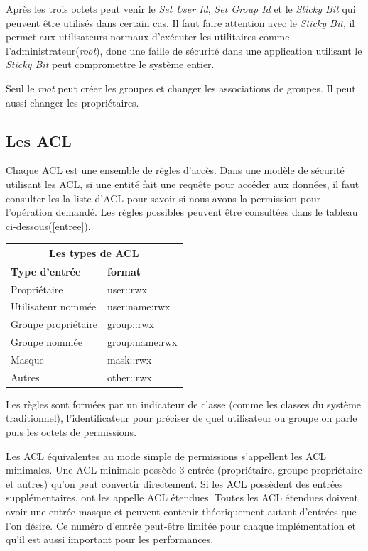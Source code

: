 Après les trois octets peut venir le \emph{Set User Id}, \emph{Set Group Id} et le \emph{Sticky Bit} qui peuvent être utilisés dans certain cas. Il faut faire attention avec le \emph{Sticky Bit}, il permet aux utilisateurs normaux d'exécuter les utilitaires comme l'administrateur(\emph{root}), donc une faille de sécurité dans une application utilisant le \emph{Sticky Bit} peut compromettre le système entier.
 
Seul le \emph{root} peut créer les groupes et changer les associations de groupes. Il peut aussi changer les propriétaires.
 
\subsection*{Les ACL}
 
Chaque ACL est une ensemble de règles d'accès. Dans une modèle de sécurité utilisant les ACL, si une entité fait une requête pour accéder aux données, il faut consulter les la liste d'ACL pour savoir si nous avons la permission pour l'opération demandé. Les règles possibles peuvent être consultées dans le tableau ci-dessous(\ref{entree}).

\begin{center}
\begin{tabular}{|l|l|}
  \hline
    \multicolumn{2}{|c|}{Les types de ACL} \\
  \hline
\textbf{Type d'entrée} & \textbf{format} \\
  \hline
Propriétaire & user::rwx \\
Utilisateur nommée & user:name:rwx \\
Groupe propriétaire & group::rwx \\
Groupe nommée & group:name:rwx \\
Masque & mask::rwx \\
Autres & other::rwx \\
  \hline
\end{tabular}
\label{tab:entree}
\end{center}
 
Les règles sont formées par un indicateur de classe (comme les classes du système traditionnel), l'identificateur pour préciser de quel utilisateur ou groupe on parle puis les octets de permissions.

Les ACL équivalentes au mode simple de permissions s'appellent les ACL minimales. Une ACL minimale possède 3 entrée (propriétaire, groupe propriétaire et autres) qu'on peut convertir directement. Si les ACL possèdent des entrées supplémentaires, ont les appelle ACL étendues. Toutes les ACL étendues doivent avoir une entrée masque et peuvent contenir théoriquement autant d'entrées que l'on désire. Ce numéro d'entrée peut-être limitée pour chaque implémentation et qu'il est aussi important pour les performances.

